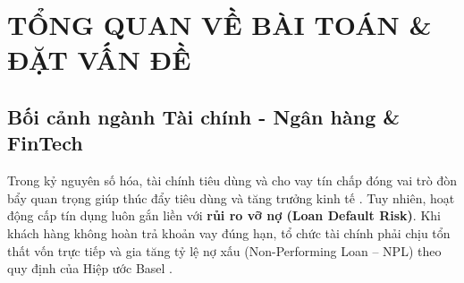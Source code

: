 \chapter{TỔNG QUAN VỀ BÀI TOÁN \& ĐẶT VẤN ĐỀ}

\section{Bối cảnh ngành Tài chính - Ngân hàng \& FinTech}
Trong kỷ nguyên số hóa, tài chính tiêu dùng và cho vay tín chấp đóng vai trò đòn bẩy quan trọng giúp thúc đẩy tiêu dùng và tăng trưởng kinh tế \cite{arminger1997}. Tuy nhiên, hoạt động cấp tín dụng luôn gắn liền với \textbf{rủi ro vỡ nợ (Loan Default Risk)}. Khi khách hàng không hoàn trả khoản vay đúng hạn, tổ chức tài chính phải chịu tổn thất vốn trực tiếp và gia tăng tỷ lệ nợ xấu (Non-Performing Loan -- NPL) theo quy định của Hiệp ước Basel \cite{basel2017}.

